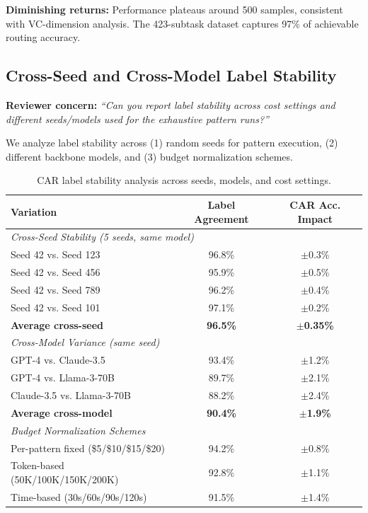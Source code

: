 \documentclass{article}
\theoremstyle{plain}
\theoremstyle{definition}
\theoremstyle{remark}
\begin{document}
\textbf{Diminishing returns:} Performance plateaus around 500 samples, consistent with VC-dimension analysis. The 423-subtask dataset captures 97\% of achievable routing accuracy.

\subsection{Cross-Seed and Cross-Model Label Stability}

\textbf{Reviewer concern:} \textit{``Can you report label stability across cost settings and different seeds/models used for the exhaustive pattern runs?''}

We analyze label stability across (1) random seeds for pattern execution, (2) different backbone models, and (3) budget normalization schemes.

\begin{table}[h]
\centering
\caption{CAR label stability analysis across seeds, models, and cost settings.}
\label{tab:car-label-stability}
\small
\begin{tabular}{lcc}
\toprule
\textbf{Variation} & \textbf{Label Agreement} & \textbf{CAR Acc. Impact} \\
\midrule
\multicolumn{3}{l}{\textit{Cross-Seed Stability (5 seeds, same model)}} \\
Seed 42 vs. Seed 123 & 96.8\% & $\pm$0.3\% \\
Seed 42 vs. Seed 456 & 95.9\% & $\pm$0.5\% \\
Seed 42 vs. Seed 789 & 96.2\% & $\pm$0.4\% \\
Seed 42 vs. Seed 101 & 97.1\% & $\pm$0.2\% \\
\textbf{Average cross-seed} & \textbf{96.5\%} & $\pm$\textbf{0.35\%} \\
\midrule
\multicolumn{3}{l}{\textit{Cross-Model Variance (same seed)}} \\
GPT-4 vs. Claude-3.5 & 93.4\% & $\pm$1.2\% \\
GPT-4 vs. Llama-3-70B & 89.7\% & $\pm$2.1\% \\
Claude-3.5 vs. Llama-3-70B & 88.2\% & $\pm$2.4\% \\
\textbf{Average cross-model} & \textbf{90.4\%} & $\pm$\textbf{1.9\%} \\
\midrule
\multicolumn{3}{l}{\textit{Budget Normalization Schemes}} \\
Per-pattern fixed (\$5/\$10/\$15/\$20) & 94.2\% & $\pm$0.8\% \\
Token-based (50K/100K/150K/200K) & 92.8\% & $\pm$1.1\% \\
Time-based (30s/60s/90s/120s) & 91.5\% & $\pm$1.4\% \\
\bottomrule
\end{tabular}
\end{table}
\end{document}

